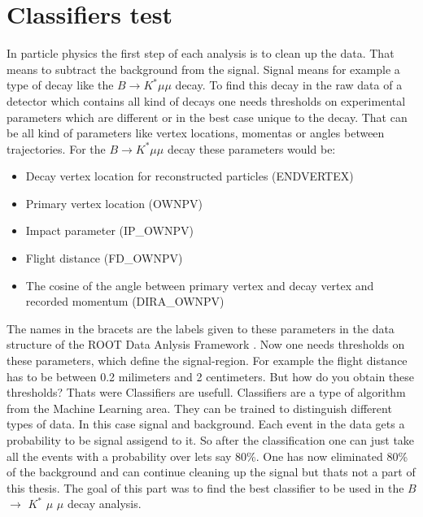 \documentclass[english]{uzhpub}
\begin{document}

 \section{Classifiers test} \label{sec:clas}

In particle physics the first step of each analysis is to clean up the data. That means to subtract the background from the signal. Signal means for example a type of decay like the $B \rightarrow K^* \mu \mu$ decay. To find this decay in the raw data of a detector which contains all kind of decays one needs thresholds on experimental parameters which are different or in the best case unique to the decay. That can be all kind of parameters like vertex locations, momentas or angles between trajectories. For the $B \rightarrow K^* \mu \mu$ decay these parameters would be:
\begin{itemize}
 \item Decay vertex location for reconstructed particles (ENDVERTEX)
 \item Primary vertex location (OWNPV)
 \item Impact parameter (IP\_OWNPV)
 \item Flight distance (FD\_OWNPV)
 \item The cosine of the angle between primary vertex and decay vertex and recorded momentum (DIRA\_OWNPV)
\end{itemize}
The names in the bracets are the labels given to these parameters in the data structure of the ROOT Data Anlysis Framework \cite{bib:root}.
Now one needs thresholds on these parameters, which define the signal-region. For example the flight distance has to be between 0.2 milimeters and 2 centimeters. But how do you obtain these thresholds? Thats were Classifiers are usefull. Classifiers are a type of algorithm from the Machine Learning area. They can be trained to distinguish different types of data. In this case signal and background. Each event in the data gets a probability to be signal assigend to it. So after the classification one can just take all the events with a probability over lets say 80\%. One has now eliminated 80\% of the background and can continue cleaning up the signal but thats not a part of this thesis. The goal of this part was to find the best classifier to be used in the  $B$ $\rightarrow$ $K^{*}$ $\mu$ $\mu$ decay analysis. \\
\end{document}
